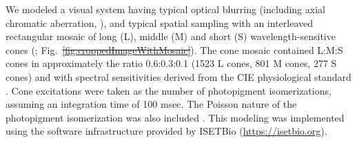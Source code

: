 \documentclass{jov}
\providecommand{\DIFaddtex}[1]{{\protect\color{blue}\uwave{#1}}} %
\providecommand{\DIFdeltex}[1]{{\protect\color{red}\sout{#1}}}                      %
\providecommand{\DIFaddbegin}{} %
\providecommand{\DIFaddend}{} %
\providecommand{\DIFdelbegin}{} %
\providecommand{\DIFdelend}{} %
\providecommand{\DIFadd}[1]{\texorpdfstring{\DIFaddtex{#1}}{#1}} %
\providecommand{\DIFdel}[1]{\texorpdfstring{\DIFdeltex{#1}}{}} %
\newcommand{\DIFscaledelfig}{0.5}
\newlength{\DIFdelgraphicswidth} %
\newlength{\DIFdelgraphicsheight} %
\newcommand{\DIFaddincludegraphics}[2][]{{\color{blue}\fbox{\DIFOincludegraphics[#1]{#2}}}} %
\newcommand{\DIFdelincludegraphics}[2][]{%
\sbox{\DIFdelgraphicsbox}{\DIFOincludegraphics[#1]{#2}}%
\settoboxwidth{\DIFdelgraphicswidth}{\DIFdelgraphicsbox} %
\settoboxtotalheight{\DIFdelgraphicsheight}{\DIFdelgraphicsbox} %
\scalebox{\DIFscaledelfig}{%
\parbox[b]{\DIFdelgraphicswidth}{\usebox{\DIFdelgraphicsbox}\\[-\baselineskip] \rule{\DIFdelgraphicswidth}{0em}}\llap{\resizebox{\DIFdelgraphicswidth}{\DIFdelgraphicsheight}{%
\setlength{\unitlength}{\DIFdelgraphicswidth}%
\begin{picture}(1,1)%
\thicklines\linethickness{2pt} %
{\color[rgb]{1,0,0}\put(0,0){\framebox(1,1){}}}%
{\color[rgb]{1,0,0}\put(0,0){\line( 1,1){1}}}%
{\color[rgb]{1,0,0}\put(0,1){\line(1,-1){1}}}%
\end{picture}%
}\hspace*{3pt}}} %
} %
\DeclareRobustCommand{\DIFaddbegin}{\DIFOaddbegin \let\includegraphics\DIFaddincludegraphics} %
\DeclareRobustCommand{\DIFaddend}{\DIFOaddend \let\includegraphics\DIFOincludegraphics} %
\DeclareRobustCommand{\DIFdelbegin}{\DIFOdelbegin \let\includegraphics\DIFdelincludegraphics} %
\DeclareRobustCommand{\DIFdelend}{\DIFOaddend \let\includegraphics\DIFOincludegraphics} %
\begin{document}
We modeled a visual system having typical optical blurring (including axial chromatic aberration, ), and typical spatial sampling with an interleaved rectangular mosaic of long (L), middle (M)  and short (S) wavelength-sensitive cones (; Fig.~\DIFdelbegin \DIFdel{\ref{fig:croppedImageWithMosaic}}\DIFdelend \DIFaddbegin \DIFadd{\ref{fig:figure9}c}\DIFaddend ). 
The cone mosaic contained L:M:S cones in approximately the ratio 0.6:0.3:0.1 (1523 L cones, 801 M cones, 277 S cones) and with spectral sensitivities derived from the CIE physiological standard \cite{CIE86}.
Cone excitations were taken as the number of photopigment isomerizations, assuming an integration time of 100 msec. 
The Poisson nature of the photopigment isomerization was also included \cite{hecht1942energy}. 
This modeling was implemented using the software infrastructure provided by ISETBio (\href{https://isetbio.org}{https://isetbio.org}).
\end{document}

